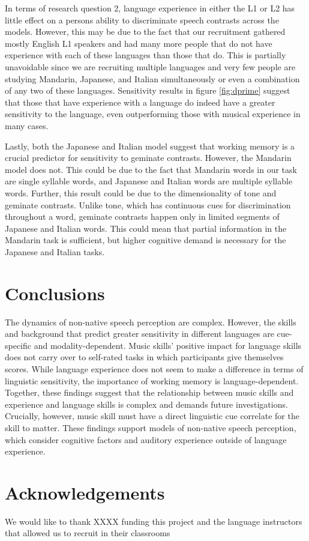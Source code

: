 \documentclass[a4paper]{article}
\begin{document}
In terms of research question 2, language experience in either the L1 or L2 has little effect on a persons ability to discriminate speech contrasts across the models. However, this may be due to the fact that our recruitment gathered mostly English L1 speakers and had many more people that do not have experience with each of these languages than those that do. This is partially unavoidable since we are recruiting multiple languages and very few people are studying Mandarin, Japanese, and Italian simultaneously or even a combination of any two of these languages. Sensitivity results in figure \ref{fig:dprime} suggest that those that have experience with a language do indeed have a greater sensitivity to the language, even outperforming those with musical experience in many cases. 

Lastly, both the Japanese and Italian model suggest that working memory is a crucial predictor for sensitivity to geminate contrasts. However, the Mandarin model does not. This could be due to the fact that Mandarin words in our task are single syllable words, and Japanese and Italian words are multiple syllable words. Further, this result could be due to the dimensionality of tone and geminate contrasts. Unlike tone, which has continuous cues for discrimination throughout a word, geminate contrasts happen only in limited segments of Japanese and Italian words. This could mean that partial information in the Mandarin task is sufficient, but higher cognitive demand is necessary for the Japanese and Italian tasks.

\section{Conclusions}

The dynamics of non-native speech perception are complex. However, the skills and background that predict greater sensitivity in different languages are cue-specific and modality-dependent. Music skills' positive impact for language skills does not carry over to self-rated tasks in which participants give themselves scores. While language experience does not seem to make a difference in terms of linguistic sensitivity, the importance of working memory is language-dependent. Together, these findings suggest that the relationship between music skills and experience and language skills is complex and demands future investigations. Crucially, however, music skill must have a direct linguistic cue correlate for the skill to matter. These findings support models of non-native speech perception, which consider cognitive factors and auditory experience outside of language experience.

\section{Acknowledgements}

We would like to thank XXXX funding this project and the language instructors that allowed us to recruit in their classrooms



\end{document}
